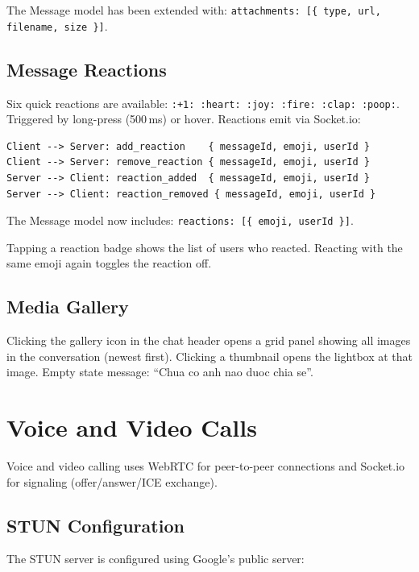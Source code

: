 \documentclass[12pt,a4paper]{article}
\newcommand{\code}[1]{\texttt{#1}}
\begin{document}
The Message model has been extended with:
\code{attachments: [\{ type, url, filename, size \}]}.

\subsection{Message Reactions}
\label{sec:reactions}

Six quick reactions are available: \texttt{:+1: :heart: :joy: :fire: :clap: :poop:}.
Triggered by long-press (500\,ms) or hover. Reactions emit via Socket.io:

\begin{lstlisting}[style=js]
Client --> Server: add_reaction    { messageId, emoji, userId }
Client --> Server: remove_reaction { messageId, emoji, userId }
Server --> Client: reaction_added  { messageId, emoji, userId }
Server --> Client: reaction_removed { messageId, emoji, userId }
\end{lstlisting}

The Message model now includes: \code{reactions: [\{ emoji, userId \}]}.

Tapping a reaction badge shows the list of users who reacted.
Reacting with the same emoji again toggles the reaction off.

\subsection{Media Gallery}
\label{sec:gallery}

Clicking the gallery icon in the chat header opens a grid panel showing
all images in the conversation (newest first). Clicking a thumbnail
opens the lightbox at that image. Empty state message:
``Chua co anh nao duoc chia se''.

\section{Voice and Video Calls}
\label{sec:calls}

Voice and video calling uses WebRTC for peer-to-peer connections and
Socket.io for signaling (offer/answer/ICE exchange).

\subsection{STUN Configuration}
\label{sec:stun}

The STUN server is configured using Google's public server:
\end{document}
